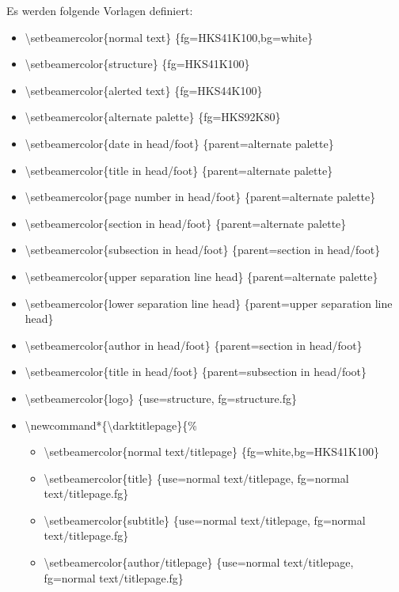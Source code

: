 \documentclass[presentation,t]{beamer}
\begin{document}
Es werden folgende Vorlagen definiert:
\begin{itemize}
\item \textbackslash setbeamercolor\{normal text\} \{fg=HKS41K100,bg=white\}
\item \textbackslash setbeamercolor\{structure\} \{fg=HKS41K100\}
\item \textbackslash setbeamercolor\{alerted text\} \{fg=HKS44K100\}
\item \textbackslash setbeamercolor\{alternate palette\} \{fg=HKS92K80\}
\item \textbackslash setbeamercolor\{date in head/foot\} \{parent=alternate palette\}
\item \textbackslash setbeamercolor\{title in head/foot\} \{parent=alternate palette\}
\item \textbackslash setbeamercolor\{page number in head/foot\} \{parent=alternate palette\}
\item \textbackslash setbeamercolor\{section in head/foot\} \{parent=alternate palette\}
\item \textbackslash setbeamercolor\{subsection in head/foot\} \{parent=section in head/foot\}
\item \textbackslash setbeamercolor\{upper separation line head\} \{parent=alternate palette\}
\item \textbackslash setbeamercolor\{lower separation line head\} \{parent=upper separation line head\}
\item \textbackslash setbeamercolor\{author in head/foot\} \{parent=section in head/foot\}
\item \textbackslash setbeamercolor\{title in head/foot\} \{parent=subsection in head/foot\}
\item \textbackslash setbeamercolor\{logo\} \{use=structure, fg=structure.fg\}
\item \textbackslash newcommand*\{\textbackslash darktitlepage\}\{\%
\begin{itemize}
\item \textbackslash setbeamercolor\{normal text/titlepage\} \{fg=white,bg=HKS41K100\}%
\item \textbackslash setbeamercolor\{title\} \{use=normal text/titlepage, fg=normal text/titlepage.fg\}%
\item \textbackslash setbeamercolor\{subtitle\} \{use=normal
     text/titlepage, fg=normal text/titlepage.fg\}%
\item \textbackslash setbeamercolor\{author/titlepage\} \{use=normal
     text/titlepage, fg=normal text/titlepage.fg\}%

\end{itemize}
\end{itemize}
\end{document}
